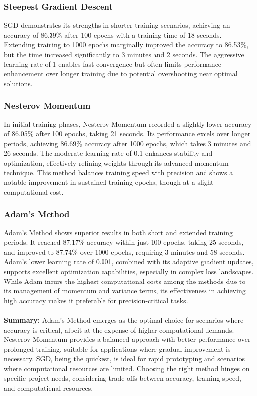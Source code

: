 \documentclass{article}
\begin{document}
\subsubsection{Steepest Gradient Descent}
SGD demonstrates its strengths in shorter training scenarios, achieving an accuracy of 86.39\% after 100 epochs with a training time of 18 seconds. Extending training to 1000 epochs marginally improved the accuracy to 86.53\%, but the time increased significantly to 3 minutes and 2 seconds. The aggressive learning rate of 1 enables fast convergence but often limits performance enhancement over longer training due to potential overshooting near optimal solutions.

\subsubsection{Nesterov Momentum}
In initial training phases, Nesterov Momentum recorded a slightly lower accuracy of 86.05\% after 100 epochs, taking 21 seconds. Its performance excels over longer periods, achieving 86.69\% accuracy after 1000 epochs, which takes 3 minutes and 26 seconds. The moderate learning rate of 0.1 enhances stability and optimization, effectively refining weights through its advanced momentum technique. This method balances training speed with precision and shows a notable improvement in sustained training epochs, though at a slight computational cost.

\subsubsection{Adam's Method}
Adam's Method shows superior results in both short and extended training periods. It reached 87.17\% accuracy within just 100 epochs, taking 25 seconds, and improved to 87.74\% over 1000 epochs, requiring 3 minutes and 58 seconds. Adam's lower learning rate of 0.001, combined with its adaptive gradient updates, supports excellent optimization capabilities, especially in complex loss landscapes. While Adam incurs the highest computational costs among the methods due to its management of momentum and variance terms, its effectiveness in achieving high accuracy makes it preferable for precision-critical tasks. \\ \\
\textbf{Summary:} Adam's Method emerges as the optimal choice for scenarios where accuracy is critical, albeit at the expense of higher computational demands. Nesterov Momentum provides a balanced approach with better performance over prolonged training, suitable for applications where gradual improvement is necessary. SGD, being the quickest, is ideal for rapid prototyping and scenarios where computational resources are limited. Choosing the right method hinges on specific project needs, considering trade-offs between accuracy, training speed, and computational resources.
\end{document}

